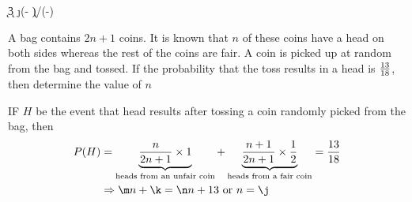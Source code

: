 


\DIVIDE{}\k
\MULTIPLY\k{3}\m
\MULTIPLY{}\n
\EXPR[0]\j{(\vbone - \k)/(\m-\n)}

\question[2] A bag contains $2n+1$ coins. It is known that $n$ of these coins have a head on 
both sides whereas the rest of the coins are fair. A coin is picked up at random 
from the bag and tossed. If the probability that the toss results in a head is $\frac{13}{18}$, 
then determine the value of $n$


\watchout[-30pt]

\ifprintanswers
\fi 

\begin{solution}[\halfpage]
  IF $H$ be the event that head results after tossing a coin randomly picked 
  from the bag, then 
  \begin{align}
    P(H) &= \underbrace{\dfrac{n}{2n+1}\times 1}_{\text{heads from an unfair coin}} 
            + \underbrace{\dfrac{n+1}{2n+1}\times\dfrac{1}{2}}_{\text{heads from a fair coin}}
            = \dfrac\vbone\vbtwo \\
          &\Rightarrow \m n + \k = \n n + \vbone \text{ or } n = \j
  \end{align} 
\end{solution}

